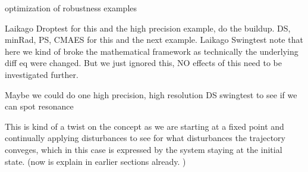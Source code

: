     optimization of robustness examples

    Laikago Droptest
        for this and the high precision example, do the buildup. 
        DS, minRad, PS, CMAES for this and the next example. 
    Laikago Swingtest
        note that here we kind of broke the mathematical framework as technically the underlying diff eq were changed. But we just ignored this, NO effects of this need to be investigated further. 


        Maybe we could do one high precision, high resolution DS swingtest to see if we can spot resonance 


    This is kind of a twist on the concept as we are starting at a fixed point and continually applying disturbances to see for what disturbances the trajectory conveges, which in this case is expressed by the system staying at the initial state. (now is explain in earlier sections already. )






























